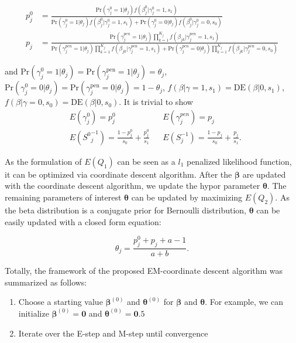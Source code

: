 \documentclass[AMA,STIX1COL,]{WileyNJD-v2}
\begin{document}
\[
\begin{aligned}
p_{j}^0 &= \frac{\text{Pr}(\gamma_{j}^0 = 1|\theta_j)f(\beta_{j}^0|\gamma_{j}^0=1, s_1) }{\text{Pr}(\gamma_{j}^0 = 1|\theta_j)f(\beta_{j}^0|\gamma_{j}^0=1, s_1) + \text{Pr}(\gamma_{j}^0 = 0|\theta_j)f(\beta^0_{j}|\gamma^0_{j}=0, s_0)}\\
p_{j} &= \frac{\text{Pr}(\gamma^{pen}_{j} = 1|\theta_j)\prod\limits_{k=1}^{K_j}f(\beta_{jk}|\gamma^{pen}_{j}=1, s_1) }{\text{Pr}(\gamma^{pen}_{j} = 1|\theta_j)\prod\limits_{k=1}^{K_j}f(\beta_{jk}|\gamma^{pen}_{j}=1, s_1) + \text{Pr}(\gamma^{pen}_{j} = 0|\theta_j)\prod\limits_{k=1}^{K_j}f(\beta_{jk}|\gamma^{pen}_{j}=0, s_0)}
\end{aligned}
\]

and
\(\text{Pr}(\gamma_{j}^{0} = 1|\theta_j) = \text{Pr}(\gamma_{j}^\text{pen}= 1|\theta_j) = \theta_j\),
\(\text{Pr}(\gamma_{j}^{0} = 0|\theta_j) = \text{Pr}(\gamma_{j}^\text{pen}= 0|\theta_j) = 1-\theta_j\),
\(f(\beta|\gamma=1, s_1) = \text{DE}(\beta|0 , s_1)\),
\(f(\beta|\gamma=0, s_0) = \text{DE}(\beta|0 , s_0)\). It is trivial to
show \[
\begin{aligned}
&E(\gamma^0_{j})  = p^0_{j} & &E(\gamma^{pen}_{j}) = p_{j}\\
&E({S^0}^{-1}_{j}) = \frac{1-p^{0}_{j}}{s_0} + \frac{p^{0}_{j}}{s_1} & &E(S^{-1}_{j}) = \frac{1-p_{j}}{s_0} + \frac{p_{j}}{s_1}.
\end{aligned}
\]

As the formulation of \(E(Q_1)\) can be seen as a \(l_1\) penalized
likelihood function, it can be optimized via coordinate descent
algorithm. After the \(\boldsymbol{\beta}\) are updated with the
coordinate descent algorithm, we update the hypor parameter
\(\boldsymbol{\theta}\). The remaining parameters of interest
\(\boldsymbol{\theta}\) can be updated by maximizing \(E(Q_2)\). As the
beta distribution is a conjugate prior for Bernoulli distribution,
\(\boldsymbol{\theta}\) can be easily updated with a closed form
equation:

\begin{equation}\label{eq:update_theta}
\theta_j = \frac{p^0_j + p_{j} + a - 1 }{a + b}.
\end{equation}

Totally, the framework of the proposed EM-coordinate descent algorithm
was summarized as follows:

\begin{enumerate}
\def\labelenumi{\arabic{enumi})}
\item
  Choose a starting value \(\boldsymbol{\beta}^{(0)}\) and
  \(\boldsymbol{\theta}^{(0)}\) for \(\boldsymbol{\beta}\) and
  \(\boldsymbol{\theta}\). For example, we can initialize
  \(\boldsymbol{\beta}^{(0)} = \boldsymbol{0}\) and
  \(\boldsymbol{\theta}^{(0)} = \boldsymbol{0}.5\)
\item
  Iterate over the E-step and M-step until convergence
\end{enumerate}
\end{document}
